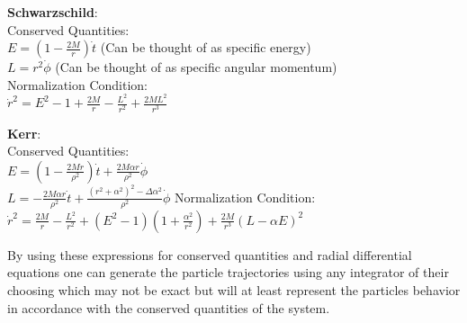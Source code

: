 \documentclass[]{article}
\begin{document}
\begin{center}
	\textbf{Schwarzschild}: \\
	Conserved Quantities: \\
	$E = (1-\frac{2M}{r}) \dot{t}$ (Can be thought of as specific energy) \\
	$L = r^2 \dot{\phi}$ (Can be thought of as specific angular momentum) \\
	Normalization Condition: \\
	$\dot{r}^2 = E^2 - 1 + \frac{2M}{r} - \frac{L^2}{r^2} + \frac{2ML^2}{r^3} $
\end{center}

\begin{center}
	\textbf{Kerr}: \\
	Conserved Quantities: \\
	$E = (1-\frac{2Mr}{\rho^2}) \dot{t} + \frac{2M\alpha r}{\rho^2}\dot{\phi}$\\
	$L = -\frac{2M\alpha r}{\rho^2}\dot{t} + \frac{(r^2 + \alpha^2)^2 - \Delta\alpha^2}{\rho^2} \dot{\phi}$
	Normalization Condition: \\
	$\dot{r}^2 = \frac{2M}{r} - \frac{L^2}{r^2} + (E^2-1)(1+\frac{\alpha^2}{r^2}) +\frac{2M}{r^3}(L-\alpha E)^2$
\end{center}

By using these expressions for conserved quantities and radial differential equations one can generate the particle trajectories using any integrator of their choosing which may not be exact but will at least represent the particles behavior in accordance with the conserved quantities of the system.
\end{document}

